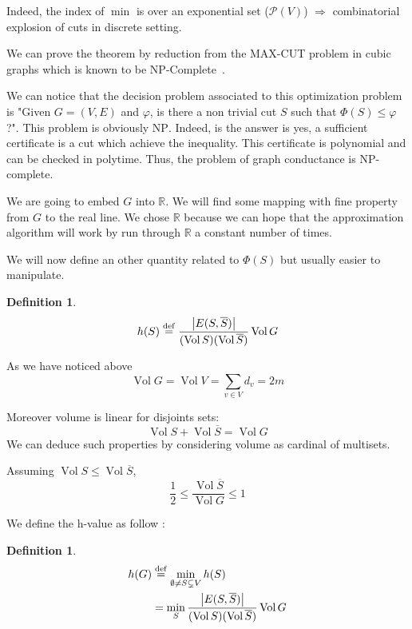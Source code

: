 \documentclass[12pt]{article}
\newtheorem{definition}[lemma]{Definition}
\newcommand{\defeq}{\stackrel{{\rm def}}{=}}
\newcommand{\RR}{\mathbb{R}}
\newcommand{\Ra}{\Rightarrow}
\newcommand{\card}[1]{\left\lvert#1\right\rvert}
\newcommand{\NP}{\textsc{NP}}
\DeclareMathOperator{\vol}{Vol}
\begin{document}
Indeed, the index of $\min$ is over an exponential set ($\mathcal{P}(V)$) $\Ra$ combinatorial explosion of cuts in discrete setting.

We can prove the theorem by reduction from the MAX-CUT problem in cubic graphs which is known to be \NP-Complete~\cite{yannakakis1978node}.

We can notice that the decision problem associated to this optimization problem is "Given $G=(V,E)$ and $\varphi$, is there a non trivial cut $S$ such that $\Phi(S) \leqslant \varphi$?". This problem is obviously \NP. Indeed, is the answer is yes, a sufficient certificate is a cut which achieve the inequality. This certificate is polynomial and can be checked in polytime. Thus, the problem of graph conductance is \NP-complete.

\bigskip

We are going to embed $G$ into $\RR$. We will find some mapping with fine property from $G$ to the real line. We chose $\RR$ because we can hope that the approximation algorithm will work by run through $\RR$ a constant number of times.

We will now define an other quantity related to $\Phi(S)$ but usually easier to manipulate.

\begin{definition}
    \[
        h(S) \defeq \frac{\card{E(S,\overline{S})}}{(\vol S)(\vol \overline{S})} \vol G
    \]
\end{definition}

As we have noticed above
\[
    \vol G = \vol V = \sum\limits_{v\in V} d_v = 2m
\]

Moreover volume is linear for disjoints sets:
\[
    \vol S + \vol \overline{S} = \vol G
\]
We can deduce such properties by considering volume as cardinal of multisets.

Assuming $\vol S \leqslant \vol \overline{S}$,
\[
    \frac{1}{2} \leqslant \frac{\vol \overline{S}}{\vol G} \leqslant 1
\]

We define the h-value as follow :

\begin{definition}
    \[
        \begin{aligned}
            h(G) &\defeq \min\limits_{\emptyset \neq S \subsetneq V} h(S)\\
            &=\min\limits_S \frac{\card{E(S,\overline{S})}}{(\vol S)(\vol \overline{S})} \vol G
        \end{aligned}
    \]
\end{definition}
\end{document}
